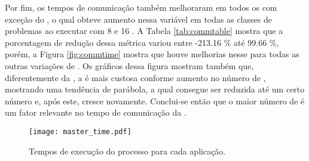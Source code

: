 Por fim, os tempos de comunicação também melhoraram em todos os  com exceção do \IS, o qual obteve aumento nessa variável em todas as classes de problemas ao executar com 8 e 16 \clusters. A Tabela \ref{tab:commtable} mostra que a porcentagem de redução dessa métrica variou entre -213.16 \% até 99.66 \%, porém, a Figura \ref{fig:commtime} mostra que houve melhorias nesse  para todas as outras variações de \clusters. Os gráficos dessa figura mostram também que, diferentemente da \IPC, a \API \ASYNC é mais custosa conforme aumento no número de \clusters, mostrando uma tendência de parábola, a qual consegue ser reduzida até um certo número e, após este, cresce novamente. Conclui-se então que o maior número de \clusters é um fator relevante no tempo de comunicação da \API \ASYNC.

\begin{table}[h]
\centering
\caption{Reduções ao comparar-se os tempos de comunicação.}
\label{tab:commtable}
\end{table}

\begin{figure}[h]
  \centering
  \caption{Tempos de execução do processo \master para cada aplicação.}
  \label{fig:mastertime}
  \texttt{[image: master\_time.pdf]}
\end{figure}

